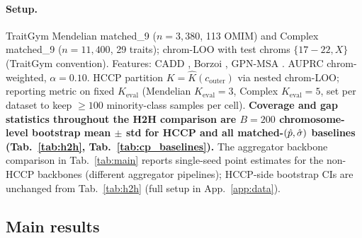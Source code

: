 
\paragraph{Setup.}
TraitGym Mendelian matched\_9 ($n = 3{,}380$, 113 OMIM) and Complex matched\_9 ($n = 11{,}400$, 29 traits); chrom-LOO with test chroms $\{17{-}22, X\}$ (TraitGym convention). Features: CADD \citep{kircher2014cadd}, Borzoi \citep{linder2025borzoi}, GPN-MSA \citep{benegas2023gpnmsa}. AUPRC chrom-weighted, $\alpha = 0.10$. HCCP partition $K = \hat K(c_{\mathrm{outer}})$ via nested chrom-LOO; reporting metric on fixed $K_{\mathrm{eval}}$ (Mendelian $K_{\mathrm{eval}} = 3$, Complex $K_{\mathrm{eval}} = 5$, set per dataset to keep $\geq 100$ minority-class samples per cell). \textbf{Coverage and gap statistics throughout the H2H comparison are $B = 200$ chromosome-level bootstrap mean $\pm$ std for HCCP and all matched-$(\hat{p}, \hat{\sigma})$ baselines (Tab.~\ref{tab:h2h}, Tab.~\ref{tab:cp_baselines}).} The aggregator backbone comparison in Tab.~\ref{tab:main} reports single-seed point estimates for the non-HCCP backbones (different aggregator pipelines); HCCP-side bootstrap CIs are unchanged from Tab.~\ref{tab:h2h} (full setup in App.~\ref{app:data}).

\subsection{Main results}

